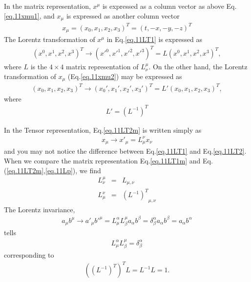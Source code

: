 \documentclass[12pt]{article}
\begin{document}
  In the matrix representation, $x^\mu$ is expressed as a column vector
  as above Eq.\ref{eq.11xmu1}, and $x_\mu$ is expressed as another column vector
\begin{eqnarray}
    x_\mu = (x_0, x_1, x_2, x_3)^T = (t, -x, -y, -z)^T \label{eq.11xmu2}
\end{eqnarray}
  The Lorentz transformation of $x^\mu$ in Eq.\ref{eq.11LT1} is expressed as
\begin{eqnarray}
    (x^0, x^1, x^2, x^3)^T \to ({x'}^0, {x'}^1, {x'}^2, {x'}^3)^T
                            = L (x^0, x^1, x^2, x^3)^T, \label{eq.11LT1m}
\end{eqnarray}
  where $L$ is the $4\times 4$ matrix representation of $L^\mu_\nu$.  On the other
  hand, the Lorentz transformation of $x_\mu$ (Eq.\ref{eq.11xmu2}) may be expressed as
\begin{eqnarray}
    (x_0, x_1, x_2, x_3)^T \to  (x_0', x_1', x_2', x_3')^T
                            = L' (x_0, x_1, x_2, x_3)^T, \label{eq.11LT2m}
\end{eqnarray}
  where
\begin{eqnarray}
    L' = (L^{-1})^T \label{eq.11Lp}
\end{eqnarray}

  In the Tensor representation, Eq.\ref{eq.11LT2m} is written simply as
\begin{eqnarray}
    x_\mu \to x'_\mu = L_\mu^\nu x_\nu \label{eq.11LT2}
\end{eqnarray}
  and you may not notice the difference between Eq.\ref{eq.11LT1} and Eq.\ref{eq.11LT2}.  When we
  compare the matrix representation Eq.\ref{eq.11LT1m} and Eq.(\ref{eq.11LT2m},\ref{eq.11Lp}), we find
\begin{eqnarray}
    L^\mu_\nu &=& { L          }_{\mu,\nu}\\
    L_\mu^\nu &=& { (L^{-1})^T }_{\mu,\nu}
\end{eqnarray}
  The Lorentz invariance,
\begin{eqnarray}
    a_\mu b^\mu \to a'_\mu b'^\mu
               = L_\mu^\alpha L^\mu_\beta a_\alpha b^\beta
               = \delta^\alpha_\beta    a_\alpha b^\beta
               = a_\alpha b^\alpha
\end{eqnarray}
  tells
\begin{eqnarray}
    L_\mu^\alpha L^\mu_\beta = \delta^\alpha_\beta \label{eq.11Ldt}
\end{eqnarray}
  corresponding to
\begin{eqnarray}
    ((L^{-1})^T)^T L = L^{-1} L = 1. \label{eq.11LLp}
\end{eqnarray}
\end{document}
